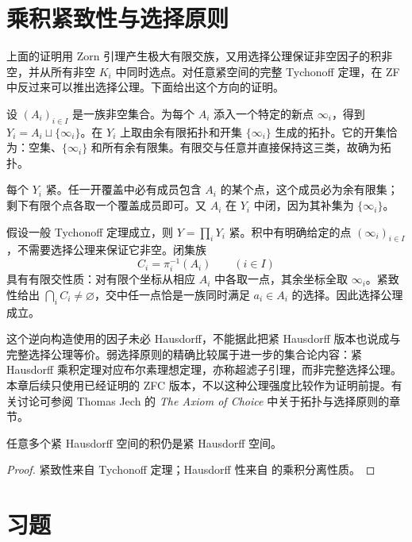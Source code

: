 \section{乘积紧致性与选择原则}

上面的证明用 Zorn 引理产生极大有限交族，又用选择公理保证非空因子的积非空，并从所有非空 \(K_i\) 中同时选点。对任意紧空间的完整 Tychonoff 定理，在 ZF 中反过来可以推出选择公理。下面给出这个方向的证明。

设 \((A_i)_{i\in I}\) 是一族非空集合。为每个 \(A_i\) 添入一个特定的新点 \(\infty_i\)，得到 \(Y_i=A_i\sqcup\{\infty_i\}\)。在 \(Y_i\) 上取由余有限拓扑和开集 \(\{\infty_i\}\) 生成的拓扑。它的开集恰为：空集、\(\{\infty_i\}\) 和所有余有限集。有限交与任意并直接保持这三类，故确为拓扑。

每个 \(Y_i\) 紧。任一开覆盖中必有成员包含 \(A_i\) 的某个点，这个成员必为余有限集；剩下有限个点各取一个覆盖成员即可。又 \(A_i\) 在 \(Y_i\) 中闭，因为其补集为 \(\{\infty_i\}\)。

假设一般 Tychonoff 定理成立，则 \(Y=\prod_iY_i\) 紧。积中有明确给定的点 \((\infty_i)_{i\in I}\)，不需要选择公理来保证它非空。闭集族
\[
 C_i=\pi_i^{-1}(A_i)\qquad(i\in I)
\]
具有有限交性质：对有限个坐标从相应 \(A_i\) 中各取一点，其余坐标全取 \(\infty_i\)。紧致性给出 \(\bigcap_i C_i\ne\varnothing\)，交中任一点恰是一族同时满足 \(a_i\in A_i\) 的选择。因此选择公理成立。

这个逆向构造使用的因子未必 Hausdorff，不能据此把紧 Hausdorff 版本也说成与完整选择公理等价。弱选择原则的精确比较属于进一步的集合论内容：紧 Hausdorff 乘积定理对应布尔素理想定理，亦称超滤子引理，而非完整选择公理。本章后续只使用已经证明的 ZFC 版本，不以这种公理强度比较作为证明前提。有关讨论可参阅 Thomas Jech 的 \emph{The Axiom of Choice} 中关于拓扑与选择原则的章节。

\begin{corollary}[紧 Hausdorff 乘积]
\label{cor:compact-hausdorff-product}
任意多个紧 Hausdorff 空间的积仍是紧 Hausdorff 空间。
\end{corollary}

\begin{proof}
紧致性来自 Tychonoff 定理；Hausdorff 性来自
的乘积分离性质。
\end{proof}

\section*{习题}

